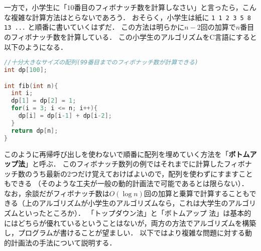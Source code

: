 \documentclass[a4paper,twoside,onecolumn,openany,article]{memoir}
\theoremstyle{remark}
\begin{document}
一方で，小学生に「$10$番目のフィボナッチ数を計算しなさい」と言ったら，こんな複雑な計算方法はとらないであろう．
おそらく，小学生は紙に \texttt{1  1  2  3 5 8 13 ...} と順番に書いていくはずだ．
この方法は明らかに$n-2$回の加算で$n$番目のフィボナッチ数を計算している．
この小学生のアルゴリズムをC言語にすると以下のようになる．
\begin{lstlisting}[basicstyle=\ttfamily\small,showstringspaces=false,language=C,frame=single]
//十分大きなサイズの配列(99番目までのフィボナッチ数が計算できる)
int dp[100];

int fib(int n){
  int i;
  dp[1] = dp[2] = 1;
  for(i = 3; i <= n; i++){
    dp[i] = dp[i-1] + dp[i-2];
  }
  return dp[n];
}
\end{lstlisting}
このように再帰呼び出しを使わないで順番に配列を埋めていく方法を「\textbf{ボトムアップ法}」と呼ぶ．
このフィボナッチ数列の例ではそれまでに計算したフィボナッチ数のうち最新の2つだけ覚えておけばよいので，配列を使わずにすますこともできる
（そのような工夫が一般の動的計画法で可能であるとは限らない）．
なお，余談だがフィボナッチ数は$O(\log n)$回の加算と乗算で計算することもできる（上のアルゴリズムが小学生のアルゴリズムなら，これは大学生のアルゴリズムといったところか）．
「トップダウン法」と「ボトムアップ 法」は基本的にはどちらが優れているということはないが，両方の方法でアルゴリズムを構築し，プログラムが書けることが望ましい．
以下ではより複雑な問題に対する動的計画法の手法について説明する．
\end{document}

